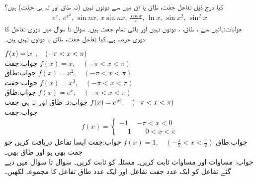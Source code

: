 
\quad کیا درج ذیل تفاعل جفت، طاق یا ان میں سے دونوں نہیں (نہ طاق اور نہ ہی جفت) ہیں؟\\
\begin{align*}
e^x,\, e^{x^2},\, \sin nx,\,x\sin nx,\, \frac{\cos x}{x},\, \ln x,\, \sin x^2,\, \sin^2 x
\end{align*}
جوابات:بائیں سے  ،  طاق، ،  دونوں نہیں اور باقی تمام جفت ہیں۔
سوال  تا سوال  میں دوری تفاعل  کا دوری عرصہ  ہے۔کیا تفاعل جفت، طاق یا دونوں نہیں ہیں۔

\quad
$f(x)=\abs{x},\quad (-\pi<x<\pi)$\\
جواب:\quad جفت
\quad
$f(x)=x,\quad (-\pi<x<\pi)$\\
جواب:\quad طاق
\quad
$f(x)=x^2,\quad (-\pi<x<\pi)$\\
جواب:\quad جفت
\quad
$f(x)=x^3,\quad (-\pi<x<\pi)$\\
جواب:\quad طاق
\quad
$f(x)=e^x,\quad (-\pi<x<\pi)$\\
جواب:\quad نہ طاق اور نہ ہی جفت
\quad
$f(x)=e^{\abs{x}},\quad (-\pi<x<\pi)$\\
جواب:\quad جفت
\begin{align*}
f(x)=
\begin{cases}
-1&-\pi<x<0\\
\phantom{-}1& \phantom{-} 0<x<\pi
\end{cases}
\end{align*}
جواب:\quad طاق
\quad 
$f(x)=1,\quad (-\frac{\pi}{2}<x<\frac{\pi}{2})$
جواب:\quad جفت
\quad ایسا تفاعل دریافت کریں جو جفت بھی ہو اور طاق بھی۔\\
جواب:\quad {}
\quad مساوات  اور مساوات  ثابت کریں۔
\quad مسئلہ  کو ثابت کریں۔
سوال  تا سوال  میں دیے گئے تفاعل کو  ایک عدد جفت تفاعل اور ایک عدد طاق تفاعل کا مجموعہ لکھیں۔

